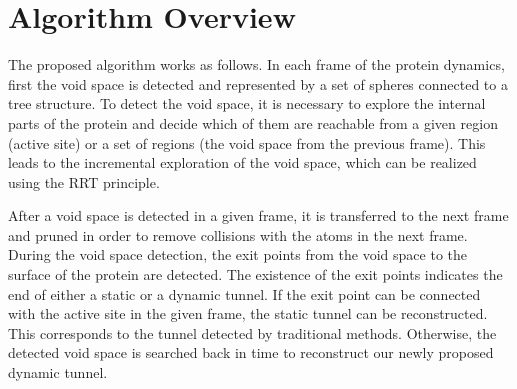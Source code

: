 \documentclass[usletter, 10pt, conference]{svjour3}      %
\begin{document}
%


\section{Algorithm Overview}

The proposed algorithm works as follows.
In each frame of the protein dynamics, first the void space is detected and represented by a set of spheres connected to a tree structure.
To detect the void space, it is necessary to explore the internal parts of the protein and decide which of them are reachable from a given region (active site) or a set of regions (the void space from the previous frame).
This leads to the incremental exploration of the void space, which can be realized using the RRT principle.

After a void space is detected in a given frame, it is transferred to the next frame and pruned in order to remove collisions with the atoms in the next frame.
During the void space detection, the exit points from the void space to the surface of the protein are detected.
The existence of the exit points indicates the end of either a static or a dynamic tunnel.
If the exit point can be connected with the active site in the given frame, the static tunnel can be reconstructed.
This corresponds to the tunnel detected by traditional methods.
Otherwise, the detected void space is searched back in time to reconstruct our newly proposed dynamic tunnel.
\end{document}

